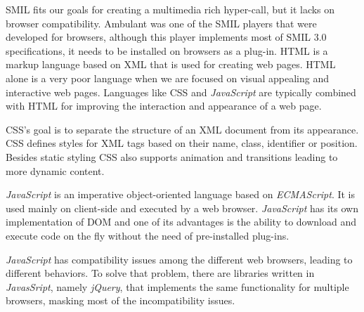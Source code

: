   \ac{SMIL} fits our goals for creating a multimedia rich hyper-call, but it lacks on browser compatibility. Ambulant \cite{ambulant} was one of the SMIL players that were developed for browsers, although this player implements most of \ac{SMIL} 3.0 \cite{smil3} specifications, it needs to be installed on browsers as a plug-in.
  \ac{HTML} is a markup language based on \ac{XML} that is used for creating web pages. \ac{HTML} alone is a very poor language when we are focused on visual appealing and interactive web pages. Languages like \ac{CSS} and \emph{JavaScript} are typically combined with \ac{HTML} for improving the interaction and appearance of a web page. 

  \ac{CSS}'s goal is to separate the structure of an \ac{XML} document from its appearance. \ac{CSS} defines styles for \ac{XML} tags based on their name, class, identifier or position.
  Besides static styling \ac{CSS} also supports animation and transitions leading to more dynamic content.

  \emph{JavaScript} is an imperative object-oriented language based on \emph{ECMAScript}. It is used mainly on client-side and executed by a web browser. \emph{JavaScript} has its own implementation of \ac{DOM} and one of its advantages is the ability to download and execute code on the fly without the need of pre-installed plug-ins.

  \emph{JavaScript} has compatibility issues among the different web browsers, leading to different behaviors. To solve that problem, there are libraries written in \emph{JavasSript}, namely \emph{jQuery}, that implements the same functionality for multiple browsers, masking most of the incompatibility issues.

